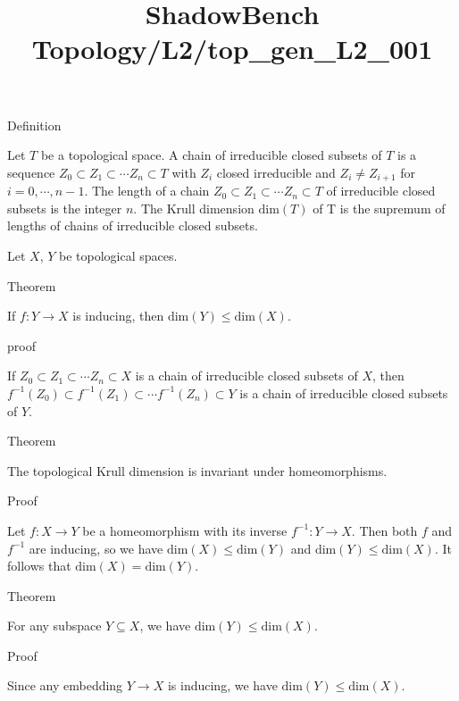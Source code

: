 \documentclass{article}
\title{ShadowBench Topology/L2/top\_gen\_L2\_001}
\begin{document}
\maketitle

Definition

Let $T$ be a topological space. 
A chain of irreducible closed subsets of $T$ is a sequence $Z_0 \subset Z_1 \subset \cdots Z_n \subset T$ with $Z_i$ closed irreducible and $Z_i \ne Z_{i+1}$ for $i=0,\cdots,n-1$. 
The length of a chain $Z_0 \subset Z_1 \subset \cdots Z_n \subset T$ of irreducible closed subsets is the integer $n$.
The Krull dimension $\text{dim}(T)$ of T is the supremum of lengths of chains of irreducible closed subsets.


Let $X$, $Y$ be topological spaces.

Theorem

If $f: Y \to X$ is inducing, then $\text{dim}(Y) \le \text{dim}(X)$.

proof

If $Z_0 \subset Z_1 \subset \cdots Z_n \subset X$ is a chain of irreducible closed subsets of $X$, then $f^{-1}(Z_0) \subset f^{-1}(Z_1) \subset \cdots f^{-1}(Z_n) \subset Y$ is a chain of irreducible closed subsets of $Y$.


Theorem

The topological Krull dimension is invariant under homeomorphisms.

Proof

Let $f:X \to Y$ be a homeomorphism with its inverse $f^{-1}:Y \to X$. Then both $f$ and $f^{-1}$ are inducing, so we have $\text{dim}(X) \le \text{dim}(Y)$ and $\text{dim}(Y) \le \text{dim}(X)$. It follows that $\text{dim}(X) = \text{dim}(Y)$.


Theorem

For any subspace $Y \subseteq X$, we have $\text{dim}(Y) \le \text{dim}(X)$.

Proof

Since any embedding $Y \to X$ is inducing, we have $\text{dim}(Y) \le \text{dim}(X)$.
\end{document}
